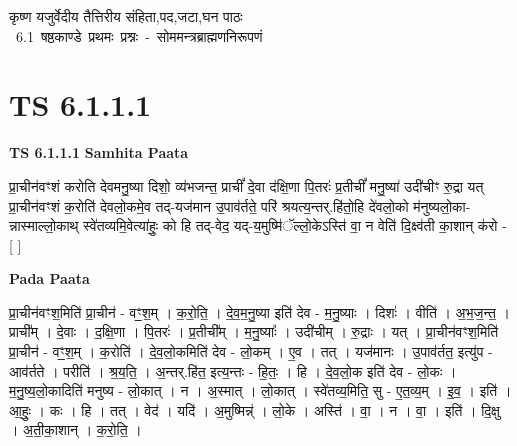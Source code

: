 \documentclass[17pt]{extarticle}
\begin{document}
\begin{titlepage}
    \begin{center}
 
\begin{sanskrit}
    { \Huge
    कृष्ण यजुर्वेदीय तैत्तिरीय संहिता,पद,जटा,घन पाठः 
    }
    \\
    \vspace{2.5cm}
    \mbox{ \Huge
    6.1      षष्ठकाण्डे प्रथमः प्रश्नः - सोममन्त्रब्राह्मणनिरूपणं   }
\end{sanskrit}
\end{center}

\end{titlepage}
\tableofcontents
\pagebreak

\section*{ TS 6.1.1.1 }

\textbf{TS 6.1.1.1 } \newline
\textbf{Samhita Paata} \newline

प्रा॒चीन॑वꣳशं करोति देवमनु॒ष्या दिशो॒ व्य॑भजन्त॒ प्राचीं᳚ दे॒वा द॑क्षि॒णा पि॒तरः॑ प्र॒तीचीं᳚ मनु॒ष्या॑ उदी॑चीꣳ रु॒द्रा यत् प्रा॒चीन॑वꣳशं क॒रोति॑ देवलो॒कमे॒व तद्-यज॑मान उ॒पाव॑र्तते॒ परि॑ श्रयत्य॒न्तर्.हि॑तो॒हि दे॑वलो॒को म॑नुष्यलो॒का-न्नास्माल्लो॒काथ् स्वे॑तव्यमि॒वेत्या॑हुः॒ को हि तद्-वेद॒ यद्-य॒मुष्मि॑ॅल्लो॒केऽस्ति॑ वा॒ न वेति॑ दि॒क्ष्व॑ती का॒शान् क॑रो - [  ] \newline

\textbf{Pada Paata} \newline

प्रा॒चीन॑वꣳश॒मिति॑ प्रा॒चीन॑ - वꣳ॒॒श॒म् । क॒रो॒ति॒ । दे॒व॒म॒नु॒ष्या इति॑ देव - म॒नु॒ष्याः । दिशः॑ । वीति॑ । अ॒भ॒ज॒न्त॒ । प्राची᳚म् । दे॒वाः । द॒क्षि॒णा । पि॒तरः॑ । प्र॒तीची᳚म् । म॒नु॒ष्याः᳚ । उदी॑चीम् । रु॒द्राः । यत् । प्रा॒चीन॑वꣳश॒मिति॑ प्रा॒चीन॑ - वꣳ॒॒श॒म् । क॒रोति॑ । दे॒व॒लो॒कमिति॑ देव - लो॒कम् । ए॒व । तत् । यज॑मानः । उ॒पाव॑र्तत॒ इत्यु॑प - आव॑र्तते । परीति॑ । श्र॒य॒ति॒ । अ॒न्तर्.हि॑त॒ इत्य॒न्तः - हि॒तः॒ । हि । दे॒व॒लो॒क इति॑ देव - लो॒कः । म॒नु॒ष्य॒लो॒कादिति॑ मनुष्य - लो॒कात् । न । अ॒स्मात् । लो॒कात् । स्वे॑तव्य॒मिति॒ सु - ए॒त॒व्य॒म् । इ॒व॒ । इति॑ । आ॒हुः॒ । कः । हि । तत् । वेद॑ । यदि॑ । अ॒मुष्मिन्न्॑ । लो॒के । अस्ति॑ । वा॒ । न । वा॒ । इति॑ । दि॒क्षु । अ॒ती॒का॒शान् । क॒रो॒ति॒ ।  \newline
\end{document}

